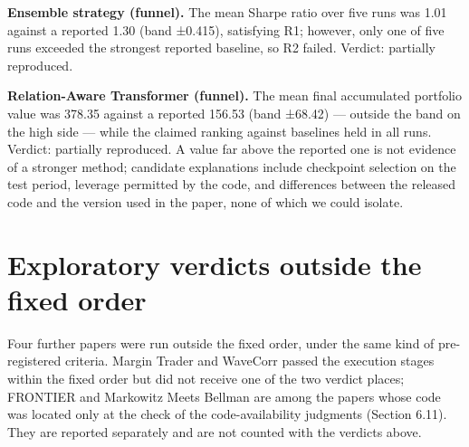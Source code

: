 \documentclass[12pt,a4paper]{report}
\newcounter{none} %
\begin{document}
\textbf{Ensemble strategy (funnel).} The mean Sharpe ratio over five
runs was 1.01 against a reported 1.30 (band ±0.415), satisfying R1;
however, only one of five runs exceeded the strongest reported baseline,
so R2 failed. Verdict: partially reproduced.

\textbf{Relation-Aware Transformer (funnel).} The mean final accumulated
portfolio value was 378.35 against a reported 156.53 (band ±68.42) ---
outside the band on the high side --- while the claimed ranking against
baselines held in all runs. Verdict: partially reproduced. A value far
above the reported one is not evidence of a stronger method; candidate
explanations include checkpoint selection on the test period, leverage
permitted by the code, and differences between the released code and the
version used in the paper, none of which we could isolate.

\section{Exploratory verdicts outside the fixed
order}\label{exploratory-verdicts-outside-the-fixed-order}

Four further papers were run outside the fixed order, under the same
kind of pre-registered criteria. Margin Trader and WaveCorr passed the
execution stages within the fixed order but did not receive one of the
two verdict places; FRONTIER and Markowitz Meets Bellman are among the
papers whose code was located only at the check of the code-availability
judgments (Section 6.11). They are reported separately and are not
counted with the verdicts above.
\end{document}
